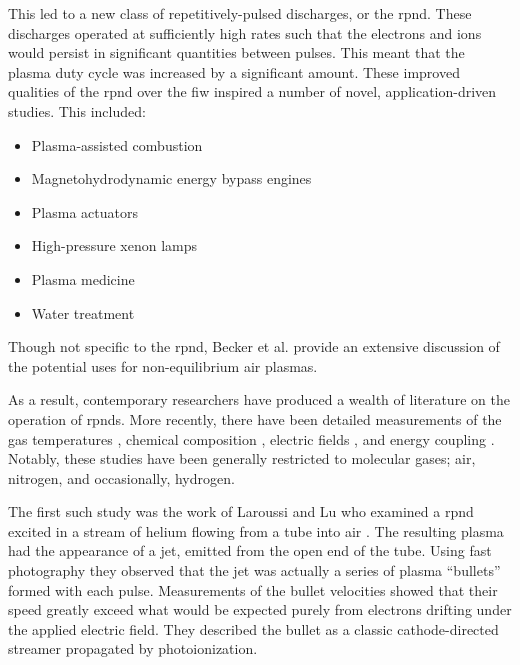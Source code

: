 This led to a new class of repetitively-pulsed discharges, or the \acs{rpnd}.
These discharges operated at sufficiently high rates such that the electrons and
ions would persist in significant quantities between pulses. This meant that the
plasma duty cycle was increased by a significant amount. These improved
qualities of the \acs{rpnd} over the \acs{fiw} inspired a number of novel,
application-driven studies. This included:
\begin{itemize}
  \item Plasma-assisted combustion \cite{Pancheshnyi2006, Starikovskaia2006, 
        Adamovich2008}
  \item Magnetohydrodynamic energy bypass engines \cite{Macheret2002,
        Adamovich2008, Schneider2009a}
  \item Plasma actuators \cite{Starikovskii2009, Adamovich2009}
  \item High-pressure xenon lamps \cite{Nikandrov2008}
  \item Plasma medicine \cite{Ayan2009, Zimmermann2012}
  \item Water treatment \cite{Foster2013}
\end{itemize}
Though not specific to the \acs{rpnd}, Becker et al. \cite{Becker2005} provide
an extensive discussion of the potential uses for non-equilibrium air plasmas.

As a result, contemporary researchers have produced a wealth of literature on
the operation of \acs{rpnd}s. More recently, there have been detailed
measurements of the gas temperatures \cite{Pilla2006, Pancheshnyi2006,
Nishihara2006, Bao2007, Lou2007, Pai2009, Zuzeek2010, Nishihara2011}, chemical
composition \cite{Bao2007, Lou2007, Pai2009}, electric fields \cite{Ito2009,
Ito2010, Muller2011a}, and energy coupling \cite{Macheret2006, Pancheshnyi2006}.
Notably, these studies have been generally restricted to molecular gases; air,
nitrogen, and occasionally, hydrogen.

The first such study was the work of Laroussi and Lu who examined a \acs{rpnd}
excited in a stream of helium flowing from a tube into air \cite{Laroussi2005,
Lu2006}. The resulting plasma had the appearance of a jet, emitted from the open
end of the tube. Using fast photography they observed that the jet was actually
a series of plasma ``bullets'' formed with each pulse. Measurements of the
bullet velocities showed that their speed greatly exceed what would be expected
purely from electrons drifting under the applied electric field. They described
the bullet as a classic cathode-directed streamer propagated by photoionization.

